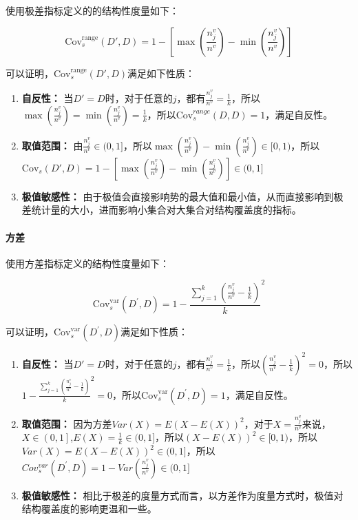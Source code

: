 \documentclass{../notes}
\newcommand{\Cov}{\text{Cov}}
\begin{document}
    使用极差指标定义的的结构性度量如下：

    \begin{equation}
        \Cov_s^{\text{range}}(D',D)=1-\left[\max\left(\frac{n_j^v}{n^v}\right)-\min\left(\frac{n_j^v}{n^v}\right)\right]
    \end{equation}

    可以证明，$\Cov_s^{\text{range}}(D',D)$满足如下性质：

    \begin{enumerate}
        \item \textbf{自反性：} 当$D' = D$时，对于任意的$j$，都有$\frac{n_j^v}{n^v}=\frac{1}{k}$，所以$\max{\left(\frac{n_j^v}{n^v}\right)}=\min(\frac{n_j^v}{n^v})=\frac{1}{k}$，所以$\Cov_s^{range}\left(D,D\right)=1$，满足自反性。
        \item \textbf{取值范围：} 由$\frac{n_j^v}{n^v}\in(0,1]$，所以$\max{\left(\frac{n_j^v}{n^v}\right)}-\min{\left(\frac{n_j^v}{n^v}\right)}\in[0,1)$，所以$\Cov_s(D',D)=1-\left[\max\left(\frac{n_j^v}{n^v}\right)-\min\left(\frac{n_j^v}{n^v}\right)\right]\in (0,1]$
        \item \textbf{极值敏感性：} 由于极值会直接影响势的最大值和最小值，从而直接影响到极差统计量的大小，进而影响小集合对大集合对结构覆盖度的指标。
    \end{enumerate}

    \paragraph*{方差}

    使用方差指标定义的结构性度量如下：

    \begin{equation}
        {\Cov_s^{\text{var}}\left(D^\prime,D\right)=1-\frac{\sum_{j=1}^{k}\left(\frac{n_j^v}{n^v}-\frac{1}{k}\right)}{k}}^2
    \end{equation}

    可以证明，$\Cov_s^{\text{var}}\left(D^\prime,D\right)$满足如下性质：

    \begin{enumerate}
        \item \textbf{自反性：} 当$D' = D$时，对于任意的$j$，都有$\frac{n_j^v}{n^v}=\frac{1}{k}$，所以$\left(\frac{n_j^v}{n^v}-\frac{1}{k}\right)^2=0$，所以${1-\frac{\sum_{j=1}^{k}\left(\frac{n_j^v}{n^v}-\frac{1}{k}\right)}{k}}^2=0$，所以$\Cov_s^{\text{var}}\left(D^\prime,D\right)=1$，满足自反性。
        \item \textbf{取值范围：} 因为方差$Var\left(X\right)=E(X-E\left(X\right))^2$，对于$X=\frac{n_j^v}{n^v}$来说，$X\in\left(0,1\right]$,$E\left(X\right)=\frac{1}{k}\in(0,1]$，所以$\left(X-E\left(X\right)\right)^2\in[0,1)$，所以$Var\left(X\right)=E(X-E\left(X\right))^2\in(0,1]$，所以$Cov_s^{var}\left(D^\prime,D\right)=1-Var\left(\frac{n_j^v}{n^v}\right)\in(0,1]$
        \item \textbf{极值敏感性：} 相比于极差的度量方式而言，以方差作为度量方式时，极值对结构覆盖度的影响更温和一些。
    \end{enumerate}
\end{document}
